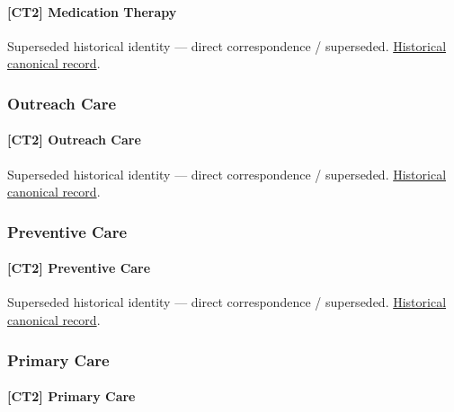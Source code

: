 \paragraph{[CT2] Medication Therapy}

\par\label{element:db064e0cd4794479be1374e97a3d7e63}
Superseded historical identity — direct correspondence / superseded. \href{../../../../continuum/strategy/capability/db064e0cd4794479be1374e97a3d7e63.md}{Historical canonical record}.\par

\subsubsection{Outreach Care}

\paragraph{[CT2] Outreach Care}

\par\label{element:75f8b32a3d5048ccbdfb30d61ae73dad}
Superseded historical identity — direct correspondence / superseded. \href{../../../../continuum/strategy/capability/75f8b32a3d5048ccbdfb30d61ae73dad.md}{Historical canonical record}.\par

\subsubsection{Preventive Care}

\paragraph{[CT2] Preventive Care}

\par\label{element:97f0d1acc37b4ca994c6c1ca006f2daa}
Superseded historical identity — direct correspondence / superseded. \href{../../../../continuum/strategy/capability/97f0d1acc37b4ca994c6c1ca006f2daa.md}{Historical canonical record}.\par

\subsubsection{Primary Care}

\paragraph{[CT2] Primary Care}

